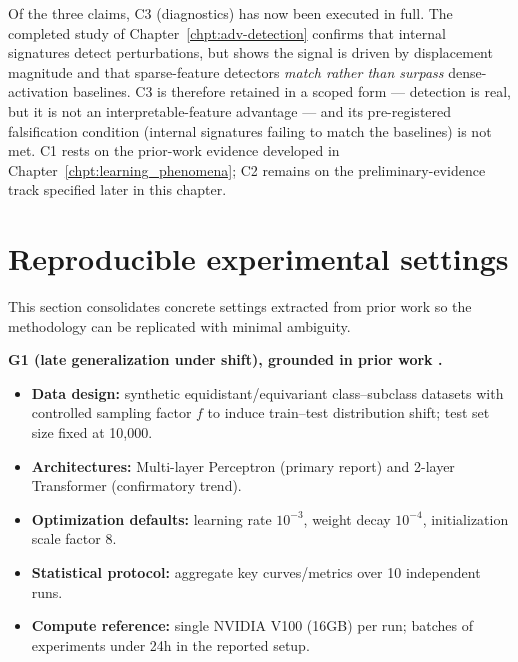 \documentclass[../ppgc-tese.tex]{subfiles}
\begin{document}
Of the three claims, C3 (diagnostics) has now been executed in full. The completed
study of Chapter~\ref{chpt:adv-detection} confirms that internal signatures detect
perturbations, but shows the signal is driven by displacement magnitude and that
sparse-feature detectors \emph{match rather than surpass} dense-activation baselines.
C3 is therefore retained in a scoped form --- detection is real, but it is not an
interpretable-feature advantage --- and its pre-registered falsification condition
(internal signatures failing to match the baselines) is not met. C1 rests on the
prior-work evidence developed in Chapter~\ref{chpt:learning_phenomena}; C2 remains on
the preliminary-evidence track specified later in this chapter.

\section{Reproducible experimental settings}
This section consolidates concrete settings extracted from prior work so the methodology can be replicated with minimal ambiguity.

\textbf{G1 (late generalization under shift), grounded in prior work \cite{carvalho2025inducing_grokking_distribution_shifts}.}
\begin{itemize}
    \item \textbf{Data design:} synthetic equidistant/equivariant class--subclass datasets with controlled sampling factor $f$ to induce train--test distribution shift; test set size fixed at 10,000.
    \item \textbf{Architectures:} Multi-layer Perceptron (primary report) and 2-layer Transformer (confirmatory trend).
    \item \textbf{Optimization defaults:} learning rate $10^{-3}$, weight decay $10^{-4}$, initialization scale factor $8$.
    \item \textbf{Statistical protocol:} aggregate key curves/metrics over 10 independent runs.
    \item \textbf{Compute reference:} single NVIDIA V100 (16GB) per run; batches of experiments under 24h in the reported setup.
\end{itemize}
\end{document}
